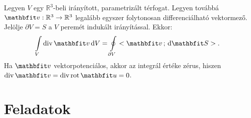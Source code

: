 \documentclass[lang=magyar]{math-handout}
\begin{document}
\vfill

\begin{theorem}
  Legyen $V$ egy $\mathbb R^3$-beli irányított, parametrizált térfogat. Legyen
  továbbá $\rvec v : \mathbb R^3 \rightarrow \mathbb R^3$ legalább egyszer
  folytonosan differenciálható vektormező. Jelölje $\partial V = S$ a $V$
  peremét indukált irányítással. Ekkor:
  \[
    \int \limits_V \Div \rvec v \, \diff V
    =
    \oint \limits_{\partial V} \scalar{\rvec v}{\diff \rvec S}
    \text.
  \]
  Ha $\rvec v$ vektorpotenciálos, akkor az integrál értéke zérus, hiszen
  $\Div \rvec v = \Div \rot \rvec u = 0$.
\end{theorem}

%
%
%

\clearpage
\section{Feladatok}

\end{document}
